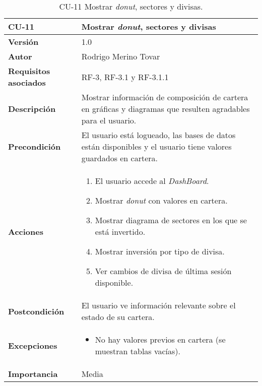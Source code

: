 \begin{table}[p]
	\centering
	\begin{tabularx}{\linewidth}{ p{} p{} }
		\toprule
		\textbf{CU-11}    & \textbf{Mostrar \emph{donut}, sectores y divisas}\\
		\toprule
		\textbf{Versión}              & 1.0    \\
		\textbf{Autor}                & Rodrigo Merino Tovar \\
		\textbf{Requisitos asociados} & RF-3, RF-3.1 y RF-3.1.1 \\
		\textbf{Descripción}          & Mostrar información de composición de cartera en gráficas y diagramas que resulten agradables para el usuario.\\
		\textbf{Precondición}         & El usuario está logueado, las bases de datos están disponibles y el usuario tiene valores guardados en cartera.  \\
		\textbf{Acciones}             &
		\begin{enumerate}
			\def\labelenumi{\arabic{enumi}.}
			\tightlist
			\item El usuario accede al \emph{DashBoard}. 
			\item Mostrar \emph{donut} con valores en cartera.
			\item Mostrar diagrama de sectores en los que se está invertido.  
			\item Mostrar inversión por tipo de divisa. 
			\item Ver cambios de divisa de última sesión disponible.
		\end{enumerate}\\
		\textbf{Postcondición}        & El usuario ve información relevante sobre el estado de su cartera. \\
		\textbf{Excepciones}          & 
		\begin{itemize}
			\tightlist
			\item No hay valores previos en cartera (se muestran tablas vacías).
		\end{itemize} \\
		\textbf{Importancia}          & Media \\
		\bottomrule
	\end{tabularx}
	\caption{CU-11 Mostrar \emph{donut}, sectores y divisas.}
\end{table}


